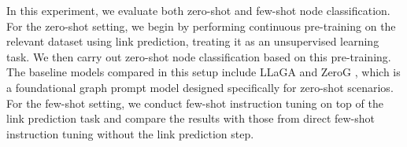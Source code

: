 In this experiment, we evaluate both zero-shot and few-shot node classification. For the zero-shot setting, we begin by performing continuous pre-training on the relevant dataset using link prediction, treating it as an unsupervised learning task. We then carry out zero-shot node classification based on this pre-training. The baseline models compared in this setup include LLaGA and ZeroG \cite{li2024zerog}, which is a foundational graph prompt model designed specifically for zero-shot scenarios. For the few-shot setting, we conduct few-shot instruction tuning on top of the link prediction task and compare the results with those from direct few-shot instruction tuning without the link prediction step.




